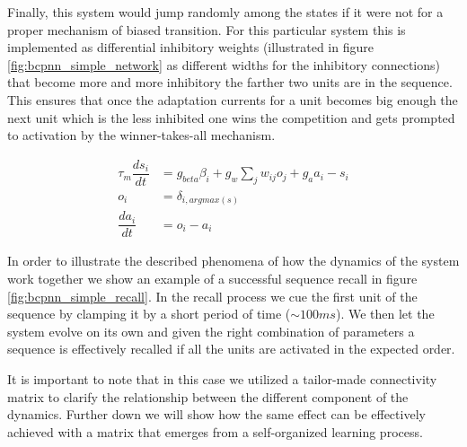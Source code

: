 \documentclass[10pt,a4paper]{article}
\begin{document}
Finally, this system would jump randomly among the states if it were not for a proper mechanism of biased transition. For this particular system this is implemented as differential inhibitory weights (illustrated in figure \ref{fig:bcpnn_simple_network} as different widths for the inhibitory connections) that become more and more inhibitory the farther two units are in the sequence. This ensures that once the adaptation currents for a unit becomes big enough the next unit which is the less inhibited one wins the competition and gets prompted to activation by the winner-takes-all mechanism.  

\begin{align}
\tau_m \dfrac{ds_i}{dt} &= g_{beta}\beta_i + g_{w}\sum_{j} w_{ij} o_j + g_a a_i - s_i \label{eq:simple_bcpnn} \\ 
o_i &=  \delta_{i, argmax(s)} \label{eq:simple_bcpnn_max} \\ 
\dfrac{da_i}{dt} &= o_i - a_i \label{eq:simple_bcpnn_adaptation}
\end{align}

In order to illustrate the described phenomena of how the dynamics of the system work together we show an example of a successful sequence recall in figure \ref{fig:bcpnn_simple_recall}. In the recall process we cue the first unit of the sequence by clamping it by a short period of time ($\sim 100ms$). We then let the system evolve on its own and given the right combination of parameters a sequence is effectively recalled if all the units are activated in the expected order. 

It is important to note that in this case we utilized a tailor-made connectivity matrix to clarify the relationship between the different component of the dynamics. Further down we will show how the same effect can be effectively achieved with a matrix that emerges from a self-organized learning process.  
\end{document}
